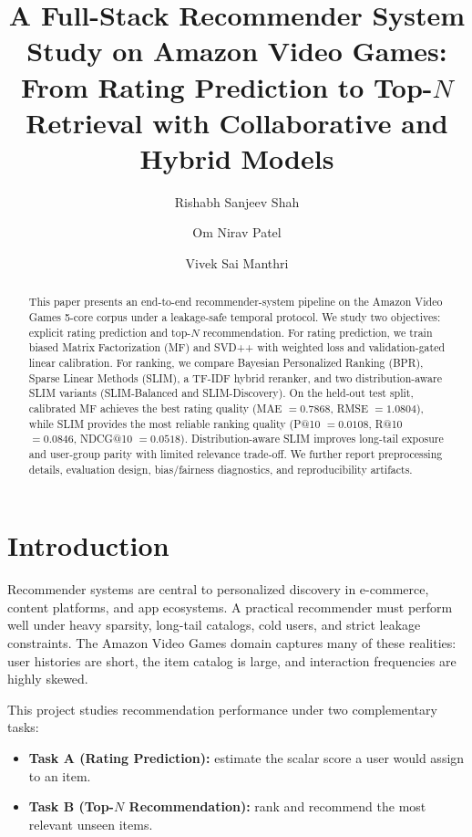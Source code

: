 \documentclass[sigconf,nonacm]{acmart}
\title{A Full-Stack Recommender System Study on Amazon Video Games:
From Rating Prediction to Top-$N$ Retrieval with Collaborative and Hybrid Models}
\author{Rishabh Sanjeev Shah}
\affiliation{%
  \institution{Rutgers University}
  \city{New Brunswick}
  \state{New Jersey}
  \country{USA}
}
\author{Om Nirav Patel}
\affiliation{%
  \institution{Rutgers University}
  \city{New Brunswick}
  \state{New Jersey}
  \country{USA}
}
\author{Vivek Sai Manthri}
\affiliation{%
  \institution{Rutgers University}
  \city{New Brunswick}
  \state{New Jersey}
  \country{USA}
}
\begin{document}
\begin{abstract}
This paper presents an end-to-end recommender-system pipeline on the Amazon
Video Games 5-core corpus under a leakage-safe temporal protocol. We study two
objectives: explicit rating prediction and top-$N$ recommendation. For rating
prediction, we train biased Matrix Factorization (MF) and SVD++ with weighted
loss and validation-gated linear calibration. For ranking, we compare Bayesian
Personalized Ranking (BPR), Sparse Linear Methods (SLIM), a TF-IDF hybrid
reranker, and two distribution-aware SLIM variants (SLIM-Balanced and
SLIM-Discovery). On the held-out test split, calibrated MF achieves the best
rating quality (MAE $=0.7868$, RMSE $=1.0804$), while SLIM provides the most
reliable ranking quality (P@10 $=0.0108$, R@10 $=0.0846$, NDCG@10 $=0.0518$).
Distribution-aware SLIM improves long-tail exposure and user-group parity with
limited relevance trade-off. We further report preprocessing details,
evaluation design, bias/fairness diagnostics, and reproducibility artifacts.
\end{abstract}


\maketitle

\section{Introduction}
Recommender systems are central to personalized discovery in e-commerce, content platforms, and app ecosystems. A practical recommender must perform well under heavy sparsity, long-tail catalogs, cold users, and strict leakage constraints. The Amazon Video Games domain captures many of these realities: user histories are short, the item catalog is large, and interaction frequencies are highly skewed.

This project studies recommendation performance under two complementary tasks:
\begin{itemize}
  \item \textbf{Task A (Rating Prediction):} estimate the scalar score a user would assign to an item.
  \item \textbf{Task B (Top-$N$ Recommendation):} rank and recommend the most relevant unseen items.
\end{itemize}
\end{document}
